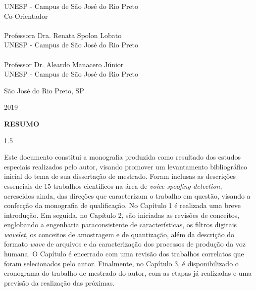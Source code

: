 \documentclass[a4paper,12pt,openright,oneside]{book}
\newenvironment{myenv}[1]
{\begin{spacing}{#1}}
	{\end{spacing}}
\begin{document}
	UNESP - Campus de São José do Rio Preto \\

	Co-Orientador \\\\

	

	Professora Dra. Renata Spolon Lobato \\ 

	UNESP - Campus de São José do Rio Preto \\\\

	

	Professor Dr. Aleardo Manacero Júnior \\

	UNESP - Campus de São José do Rio Preto \\

	\vspace{1.0cm}




	\begin{center}

		São José do Rio Preto, SP  \\ \vspace{1.0pt}

		2019

	\end{center}
\setlength{\parindent}{0pt}
\newpage \thispagestyle{empty}
\vspace{1.5cm}
\fontsize{12}{\baselineskip} \selectfont

\begin{center}
{\huge{\textbf{RESUMO}}}
\end{center}

\begin{myenv}{1.5}
\fontsize{12}{\baselineskip} \selectfont \onehalfspacing
\par \null
\par \null
\par Este documento constitui a monografia produzida como resultado dos estudos especiais realizados pelo autor, visando promover um levantamento bibliográfico inicial do tema de sua dissertação de mestrado. Foram inclusas as descrições essenciais de 15 trabalhos científicos na área de \textit{voice spoofing detection}, acrescidos ainda, das direções que caracterizam o trabalho em questão, visando a confecção da monografia de qualificação. No Capítulo 1 é realizada uma breve introdução. Em seguida, no Capítulo 2, são iniciadas as revisões de conceitos, englobando a engenharia paraconsistente de características, os filtros digitais \textit{wavelet}, os conceitos de amostragem e de quantização, além da descrição do formato \textit{wave} de arquivos e da caracterização dos processos de produção da voz humana. O Capítulo é encerrado com uma revisão dos trabalhos correlatos que foram selecionados pelo autor. Finalmente, no Capítulo 3, é disponibilizado o cronograma do trabalho de mestrado do autor, com as etapas já realizadas e uma previsão da realização das próximas.
\end{myenv}
\end{document}
